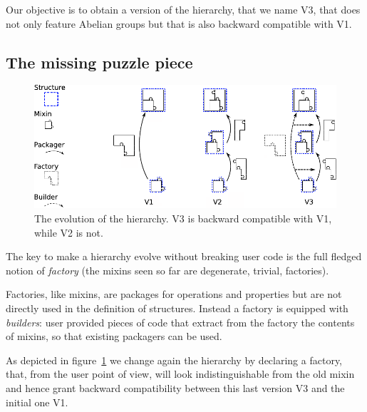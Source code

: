 \documentclass[a4paper,UKenglish,cleveref, autoref]{lipics-v2019}
\newcommand{\mixin}{mixin}
\newcommand{\mixins}{mixins}
\newcommand{\factory}{factory}
\newcommand{\factories}{factories}
\newcommand{\Factories}{Factories}
\newcommand{\packager}{packager}
\newcommand{\builder}{builder}
\theoremstyle{implem}
\theoremstyle{implem}
\theoremstyle{command}
\begin{document}
Our objective is to obtain a version of the hierarchy, that we name V3, that does
not only feature Abelian groups but that is also backward compatible
with V1.

\subsection{The missing puzzle piece}

\begin{figure}[!h]
  \begin{center}
    \includegraphics[width=\textwidth]{puzzle.pdf}
  \end{center}
  \caption{\label{fig:puzzle}The evolution of the hierarchy. V3 is backward compatible with V1, while V2 is not.}
\end{figure}

The key to make a hierarchy evolve without breaking user code is the full
fledged notion of \emph{\factory{}} (the \mixins{} seen so far are degenerate,
trivial, \factories{}).

\Factories{}, like \mixins{}, are packages for operations and properties but are
not directly used in the definition of structures. Instead a \factory{} is
equipped with \emph{\builder{}s}: user provided pieces of code that extract
from the \factory{} the contents of \mixins{}, so that existing
\packager{}s can be used.

As depicted in figure~\ref{fig:puzzle} we change again the hierarchy
by declaring a  \factory{}, that, from the user point of view,
will look indistinguishable from the old  \mixin{}
and hence grant backward compatibility between this last version V3 and the
initial one V1.
\end{document}
